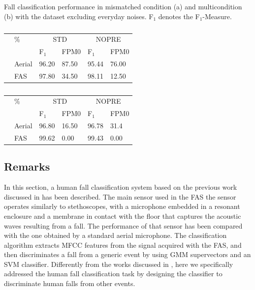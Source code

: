 \begin{table}[t]
	\centering
	\caption{Fall classification performance in mismatched condition (a) and multicondition (b) with the dataset excluding everyday noises. F$_1$ denotes the F$_1$-Measure.}

	\begin{subtable}[b]{1\textwidth}
		\centering
		\caption{}\label{tab:mism_lolo44}		
		\begin{tabularx}{\textwidth}{ | c  X | X  X | X  X | }
			\hline
			&	\%		&\multicolumn{2}{c|}{STD}					&\multicolumn{2}{c|}{NOPRE}  \\
			&		  	& \hspace{0.15cm}F$_1$	& FPM0 				&\hspace{0.15cm}F$_1$ 	& FPM0   \\ \hline
			& Aerial  	& 96.20 				& 87.50				& 95.44	& 76.00	  		\\
			& FAS 	 	& 97.80 				& 34.50	  			& 98.11 & 12.50	   \\ \hline
			
		\end{tabularx}
	\end{subtable}
	\begin{subtable}[b]{1\textwidth}
		\centering
		\caption{}\label{tab:multi_lolo44}		
		\begin{tabularx}{\textwidth}{ | c X | X  X | X  X | }
			\hline
			&	\%		&\multicolumn{2}{c|}{STD} 					&\multicolumn{2}{c|}{NOPRE}  \\
			&		  	& \hspace{0.15cm}F$_1$	& FPM0 				& \hspace{0.15cm}F$_1$		& FPM0   \\ \hline
			& Aerial  	& 96.80 				& 16.50				& 96.78 	& 31.4	  		\\
			& FAS 	 	& 99.62 				& 0.00				& 99.43  	& 0.00	   \\ \hline
			
		\end{tabularx}
	\end{subtable}

\end{table}
\subsection{Remarks}
In this section, a human fall classification system based on the previous work discussed in  has been described. The main sensor used in the FAS the sensor operates similarly to stethoscopes, with a microphone embedded in a resonant enclosure and a membrane in contact with the floor that captures the acoustic waves resulting from a fall. The performance of that sensor has been compared with the one obtained by a standard aerial microphone. The classification algorithm extracts MFCC features from the signal acquired with the FAS, and then discriminates a fall from a generic event by using GMM supervectors and an SVM classifier. Differently from the works discussed in  , here we specifically addressed the human fall classification task by designing the classifier to discriminate human falls from other events.

